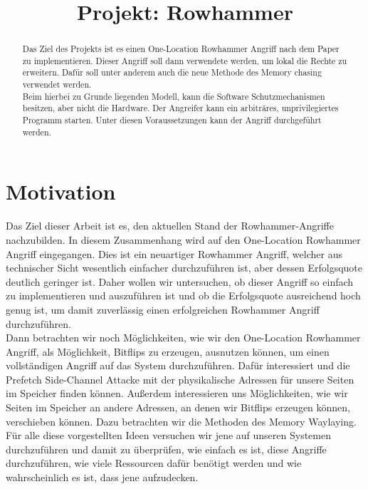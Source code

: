 \documentclass[conference]{IEEEtran}
\begin{document}
\title{Projekt: Rowhammer}


\author{
}
\maketitle

\begin{abstract}
Das Ziel des Projekts ist es einen One-Location Rowhammer Angriff nach dem Paper \cite{DBLP:journals/corr/abs-1710-00551} zu implementieren. Dieser Angriff soll dann verwendete werden, um lokal die Rechte zu erweitern. Dafür soll unter anderem auch die neue Methode des Memory chasing verwendet werden.\\
Beim hierbei zu Grunde liegenden Modell, kann die Software Schutzmechanismen besitzen, aber nicht die Hardware. Der Angreifer kann ein arbiträres, unprivilegiertes Programm starten. Unter diesen Voraussetzungen kann der Angriff durchgeführt werden.


\end{abstract}

\section{Motivation}
Das Ziel dieser Arbeit ist es, den aktuellen Stand der Rowhammer-Angriffe nachzubilden. In diesem Zusammenhang wird auf den One-Location Rowhammer Angriff eingegangen. Dies ist ein neuartiger Rowhammer Angriff, welcher aus technischer Sicht wesentlich einfacher durchzuführen ist, aber dessen Erfolgsquote deutlich geringer ist. Daher wollen wir untersuchen, ob dieser Angriff so einfach zu implementieren und auszuführen ist und ob die Erfolgsquote ausreichend hoch genug ist, um damit zuverlässig einen erfolgreichen Rowhammer Angriff durchzuführen.\\
Dann betrachten wir noch Möglichkeiten, wie wir den One-Location Rowhammer Angriff, als Möglichkeit, Bitflips zu erzeugen, ausnutzen können, um einen vollständigen Angriff auf das System durchzuführen. Dafür interessiert und die Prefetch Side-Channel Attacke mit der physikalische Adressen für unsere Seiten im Speicher finden können. Außerdem interessieren uns Möglichkeiten, wie wir Seiten im Speicher an andere Adressen, an denen wir Bitflips erzeugen können, verschieben können. Dazu betrachten wir die Methoden des Memory Waylaying.\\
Für alle diese vorgestellten Ideen versuchen wir jene auf unseren Systemen durchzuführen und damit zu überprüfen, wie einfach es ist, diese Angriffe durchzuführen, wie viele Ressourcen dafür benötigt werden und wie wahrscheinlich es ist, dass jene aufzudecken.
\end{document}
